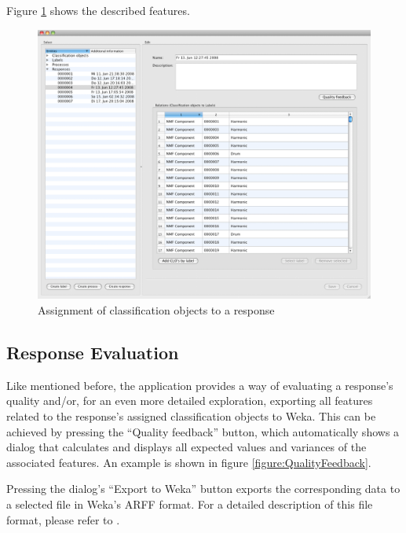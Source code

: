 Figure \ref{figure:COAssignment} shows the described features.

\begin{figure}
    \includegraphics[width=\textwidth]{images/COAssignment.png}
    \caption{%
        \label{figure:COAssignment}%
        Assignment of classification objects to a response
    }
\end{figure}


\subsection{Response Evaluation}

Like mentioned before, the application provides a way of evaluating a response's
quality and/or, for an even more detailed exploration, exporting all features
related to the response's assigned classification objects to Weka.  This can be
achieved by pressing the ``Quality feedback'' button, which automatically shows
a dialog that calculates and displays all expected values and variances of the
associated features. An example is shown in figure \ref{figure:QualityFeedback}.

Pressing the dialog's ``Export to Weka'' button exports the corresponding data
to a selected file in Weka's ARFF format. For a detailed description of this
file format, please refer to \cite{Weka}.

